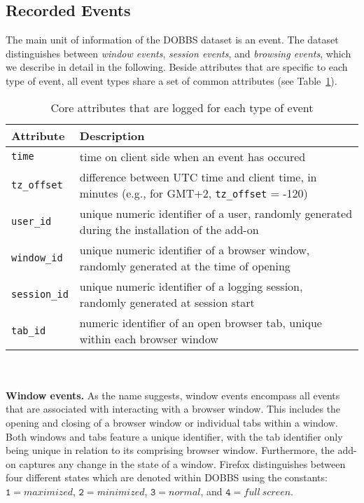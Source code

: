 \documentclass[11pt,fleqn,twoside]{article}
\begin{document}
\subsection{Recorded Events}
\label{sec:data}
The main unit of information of the DOBBS dataset is an event. The dataset distinguishes between \textit{window events}, \textit{session events}, and \textit{browsing events}, which we describe in detail in the following. Beside attributes that are specific to each type of event, all event types share a set of common attributes (see Table~\ref{tab:core_attributes}).
\begin{table}
\small
\begin{center}
\begin{tabular}{|l|p{8cm}|}
  \hline
  \textbf{Attribute} & \textbf{Description} \\
  \hline
  \texttt{time} &  time on client side when an event has occured\\
  \hline
  \texttt{tz\_offset} &  difference between UTC time and client time, in minutes (e.g., for GMT+2, \texttt{tz\_offset} = -120)\\
  \hline
  \texttt{user\_id} &  unique numeric identifier of a user, randomly generated during the installation of the add-on\\
  \hline
  \texttt{window\_id} &  unique numeric identifier of a browser window, randomly generated at the time of opening\\
  \hline
  \texttt{session\_id} &  unique numeric identifier of a logging session, randomly generated at session start\\
  \hline
  \texttt{tab\_id} &  numeric identifier of an open browser tab, unique within each browser window\\
  \hline
\end{tabular} 
\end{center}
\caption{Core attributes that are logged for each type of event} 
\label{tab:core_attributes}
\end{table}
\\
\\
\textbf{Window events.}
As the name suggests, window events encompass all events that are associated with interacting with a browser window. This includes the opening and closing of a browser window or individual tabs within a window. Both windows and tabs feature a unique identifier, with the tab identifier only being unique in relation to its comprising browser window. Furthermore, the add-on captures any change in the state of a window. Firefox distinguishes between four different states which are denoted within DOBBS using the constants: $\texttt{1} = maximized$, $\texttt{2} = minimized$, $\texttt{3} = normal$, and $\texttt{4} = full\ screen$.
\end{document}
